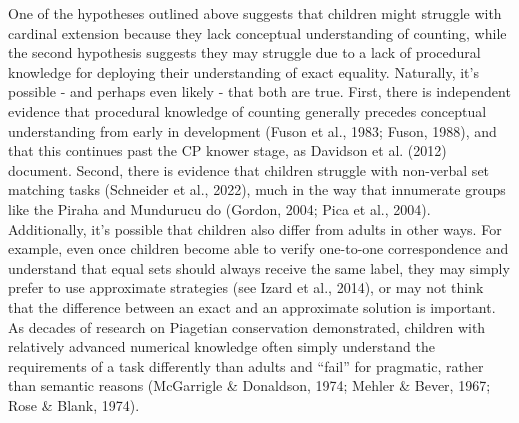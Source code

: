 \documentclass[
  man,floatsintext]{apa7}
\begin{document}
One of the hypotheses outlined above suggests that children might struggle with cardinal extension because they lack conceptual understanding of counting, while the second hypothesis suggests they may struggle due to a lack of procedural knowledge for deploying their understanding of exact equality. Naturally, it's possible - and perhaps even likely - that both are true. First, there is independent evidence that procedural knowledge of counting generally precedes conceptual understanding from early in development (Fuson et al., 1983; Fuson, 1988), and that this continues past the CP knower stage, as Davidson et al. (2012) document. Second, there is evidence that children struggle with non-verbal set matching tasks (Schneider et al., 2022), much in the way that innumerate groups like the Piraha and Mundurucu do (Gordon, 2004; Pica et al., 2004). Additionally, it's possible that children also differ from adults in other ways. For example, even once children become able to verify one-to-one correspondence and understand that equal sets should always receive the same label, they may simply prefer to use approximate strategies (see Izard et al., 2014), or may not think that the difference between an exact and an approximate solution is important. As decades of research on Piagetian conservation demonstrated, children with relatively advanced numerical knowledge often simply understand the requirements of a task differently than adults and ``fail'' for pragmatic, rather than semantic reasons (McGarrigle \& Donaldson, 1974; Mehler \& Bever, 1967; Rose \& Blank, 1974).
\end{document}
